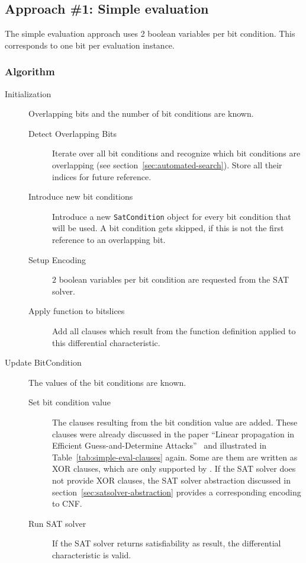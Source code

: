 \subsection{Approach \#1: Simple evaluation}
\label{sec:encoding:simple-evaluation}
%
The simple evaluation approach uses 2 boolean variables per bit condition. This corresponds to one bit per evaluation instance.

\subsubsection{Algorithm}
\label{sec:simple-evaluation-algorithm}
%
\begin{description}
  \item[Initialization] Overlapping bits and the number of bit conditions are known.
    \begin{description}
      \item[Detect Overlapping Bits] Iterate over all bit conditions and recognize which bit conditions are overlapping (see section~\ref{sec:automated-search}). Store all their indices for future reference.
      \item[Introduce new bit conditions] Introduce a new \texttt{SatCondition} object for every bit condition that will be used. A bit condition gets skipped, if this is not the first reference to an overlapping bit.
      \item[Setup Encoding] $2$ boolean variables per bit condition are requested from the SAT solver.
      \item[Apply function to bitslices] Add all clauses which result from the function definition applied to this differential characteristic.
    \end{description}
  \item[Update BitCondition] The values of the bit conditions are known.
    \begin{description}
      \item[Set bit condition value] The clauses resulting from the bit condition value are added. These clauses were already discussed in the paper ``Linear propagation in Efficient Guess-and-Determine Attacks''~\cite[6]{Cry16} and illustrated in Table~\ref{tab:simple-eval-clauses} again. Some are them are written as XOR clauses, which are only supported by \cmsat{}. If the SAT solver does not provide XOR clauses, the SAT solver abstraction discussed in section~\ref{sec:satsolver-abstraction} provides a corresponding encoding to CNF.
      \item[Run SAT solver] If the SAT solver returns satisfiability as result, the differential characteristic is valid.
    \end{description}
\end{description}

